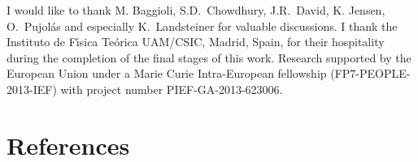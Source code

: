 \documentclass[a4paper]{jpconf}
\begin{document}
\ack
I would like to thank M. Baggioli, S.D.~Chowdhury, J.R.~David, K. Jensen, O.~Pujol\'as and especially K.~Landsteiner for valuable discussions. I thank the Instituto de F\'{\i}sica Te\'orica UAM/CSIC, Madrid, Spain, for their hospitality during the completion of the final stages of this work. Research supported by the European Union under a Marie Curie Intra-European fellowship (FP7-PEOPLE-2013-IEF) with project number PIEF-GA-2013-623006. 

\section*{References}


\end{document}
